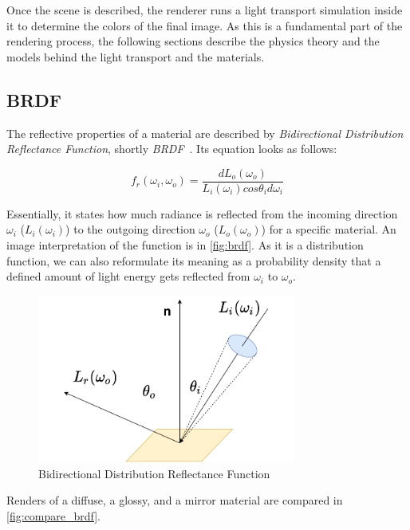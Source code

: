Once the scene is described, the renderer runs a light transport simulation inside it to determine the colors of the final image. As this is a fundamental part of the rendering process, the following sections describe the physics theory and the models behind the light transport and the materials.

\subsection{BRDF}
\label{sec:BRDF}

The reflective properties of a material are described by \emph{Bidirectional Distribution Reflectance Function}, shortly \emph{BRDF}~\cite{nicodemus1965directional}. Its equation looks as follows:

\begin{equation} \label{eq:brdf}
f_r(\omega_i,\omega_o)=\frac{dL_o(\omega_o)}{L_i(\omega_i)cos\theta_i d\omega_i}
\end{equation}

Essentially, it states how much radiance is reflected from the incoming direction $\omega_i$ ($L_i(\omega_i)$) to the outgoing direction $\omega_o$ ($L_o(\omega_o)$) for a specific material.
An image interpretation of the function is in \autoref{fig:brdf}. As it is a distribution function, we can also reformulate its meaning as a probability density that a defined amount of light energy gets reflected from $\omega_i$ to $\omega_o$.

\begin{figure}[h]
	\centering
	\includegraphics[width=85mm]{img/brdf.pdf}
	\caption{Bidirectional Distribution Reflectance Function}
	\label{fig:brdf}
\end{figure}

Renders of a diffuse, a glossy, and a mirror material are compared in \autoref{fig:compare_brdf}.


